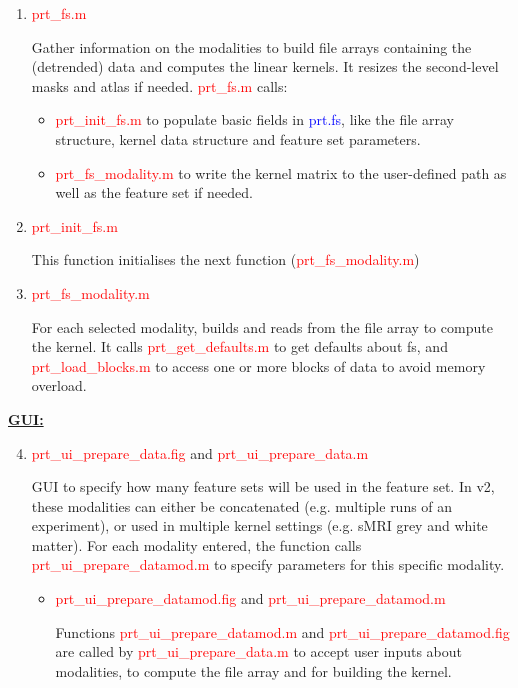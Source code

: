 \begin{enumerate}

\item \textcolor{red}{prt\_fs.m}

Gather information on the modalities to build file arrays containing the (detrended) data and computes the linear kernels. It resizes the second-level masks and atlas if needed. \textcolor{red}{prt\_fs.m} calls:
\begin{itemize}
\item \textcolor{red}{prt\_init\_fs.m} to populate basic fields in \textcolor{blue}{prt.fs}, like the file array structure, kernel data structure and feature set parameters. 
\item \textcolor{red}{prt\_fs\_modality.m} to write the kernel matrix to the user-defined path as well as the feature set if needed.
\end{itemize}

\item \textcolor{red}{prt\_init\_fs.m}

     This function initialises the next function (\textcolor{red}{prt\_fs\_modality.m})
     
\item \textcolor{red}{prt\_fs\_modality.m}

    For each selected modality, builds and reads from the file array to compute the kernel. It calls \textcolor{red}{prt\_get\_defaults.m} to get defaults about fs, and \textcolor{red}{prt\_load\_blocks.m} to access one or more blocks of data to avoid memory overload. 

\end{enumerate}


\noindent \textbf{\underline{GUI:}}

\begin{enumerate}
\setcounter{enumi}{3}

\item \textcolor{red}{prt\_ui\_prepare\_data.fig} and \textcolor{red}{prt\_ui\_prepare\_data.m}

GUI to specify how many feature sets will be used in the feature set. In v2, these modalities can either be concatenated (e.g. multiple runs of an experiment), or used in multiple kernel settings (e.g. sMRI grey and white matter). For each modality entered, the function calls \textcolor{red}{prt\_ui\_prepare\_datamod.m} to specify parameters for this specific modality.

\begin{itemize}
\item \textcolor{red}{prt\_ui\_prepare\_datamod.fig} and \textcolor{red}{prt\_ui\_prepare\_datamod.m}

Functions \textcolor{red}{prt\_ui\_prepare\_datamod.m} and \textcolor{red}{prt\_ui\_prepare\_datamod.fig} are called by \textcolor{red}{prt\_ui\_prepare\_data.m} to accept user inputs about modalities, to compute the file array and for building the kernel.
\end{itemize}

\end{enumerate}

